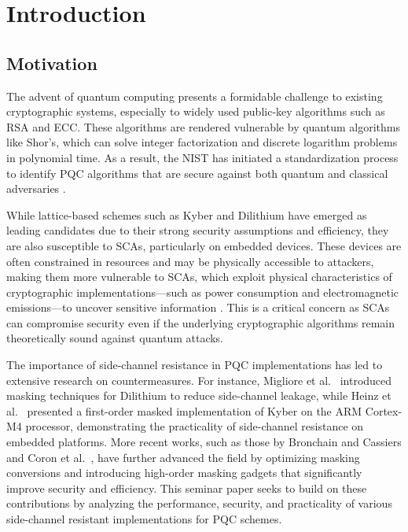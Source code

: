 \chapter{Introduction}
\thispagestyle{chapterstart}

\section{Motivation}

The advent of quantum computing presents a formidable challenge to existing cryptographic systems, especially to widely used public-key algorithms such as RSA and \ac{ECC}. These algorithms are rendered vulnerable by quantum algorithms like Shor's, which can solve integer factorization and discrete logarithm problems in polynomial time. As a result, the \ac{NIST} has initiated a standardization process to identify \ac{PQC} algorithms that are secure against both quantum and classical adversaries \cite{NIST24}.

While lattice-based schemes such as Kyber and Dilithium have emerged as leading candidates due to their strong security assumptions and efficiency, they are also susceptible to \acp{SCA}, particularly on embedded devices. These devices are often constrained in resources and may be physically accessible to attackers, making them more vulnerable to \acp{SCA}, which exploit physical characteristics of cryptographic implementations—such as power consumption and electromagnetic emissions—to uncover sensitive information \cite{Bos21}. This is a critical concern as \acp{SCA} can compromise security even if the underlying cryptographic algorithms remain theoretically sound against quantum attacks.

The importance of side-channel resistance in \ac{PQC} implementations has led to extensive research on countermeasures. For instance, Migliore et al.\ \cite{Migliore19} introduced masking techniques for Dilithium to reduce side-channel leakage, while Heinz et al.\ \cite{Heinz20} presented a first-order masked implementation of Kyber on the \ac{ARM} Cortex-M4 processor, demonstrating the practicality of side-channel resistance on embedded platforms. More recent works, such as those by Bronchain and Cassiers \cite{Bronchain22} and Coron et al.\ \cite{Coron23}, have further advanced the field by optimizing masking conversions and introducing high-order masking gadgets that significantly improve security and efficiency. This seminar paper seeks to build on these contributions by analyzing the performance, security, and practicality of various side-channel resistant implementations for \ac{PQC} schemes.

